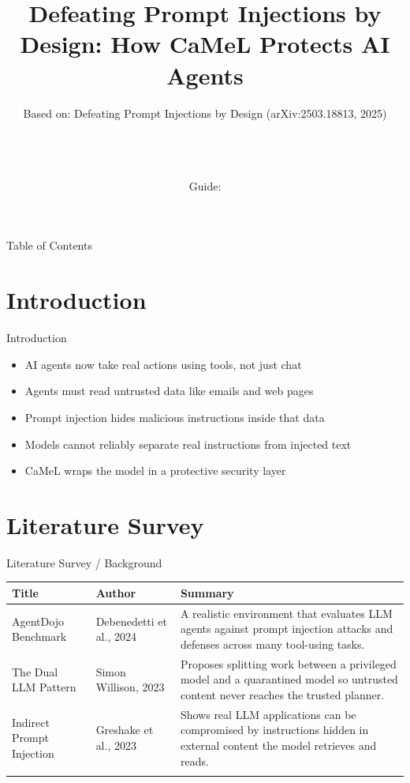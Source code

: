\documentclass[10pt]{beamer}
\title[B.Tech Seminar]{Defeating Prompt Injections by Design: How CaMeL Protects AI Agents}
\subtitle{Based on: Defeating Prompt Injections by Design (arXiv:2503.18813, 2025)}
\author[\studentname\ (\shortinst)]{\studentname \\ \small \rollno \\ \small \rollclass \\ \small Guide: \guidename}
\institute[]{\deptname \\ \collegename}
\date{\seminardate}
\begin{document}
\begin{frame}[plain]
  \titlepage
\end{frame}

\begin{frame}{Table of Contents}
  \tableofcontents
\end{frame}

\section{Introduction}
\begin{frame}{Introduction}
\begin{itemize}
  \item AI agents now take real actions using tools, not just chat
  \item Agents must read untrusted data like emails and web pages
  \item Prompt injection hides malicious instructions inside that data
  \item Models cannot reliably separate real instructions from injected text
  \item CaMeL wraps the model in a protective security layer
\end{itemize}
\end{frame}

\section{Literature Survey}
\begin{frame}{Literature Survey / Background}
  \small
  \begin{tabular}{@{}p{2.7cm}p{2.3cm}p{5.6cm}@{}}
    \toprule
    \textbf{Title} & \textbf{Author} & \textbf{Summary} \\
    \midrule
    AgentDojo Benchmark & Debenedetti et al., 2024 & A realistic environment that evaluates LLM agents against prompt injection attacks and defenses across many tool-using tasks. \\
    \addlinespace
    The Dual LLM Pattern & Simon Willison, 2023 & Proposes splitting work between a privileged model and a quarantined model so untrusted content never reaches the trusted planner. \\
    \addlinespace
    Indirect Prompt Injection & Greshake et al., 2023 & Shows real LLM applications can be compromised by instructions hidden in external content the model retrieves and reads. \\
    \addlinespace
    \bottomrule
  \end{tabular}
\end{frame}
\end{document}
